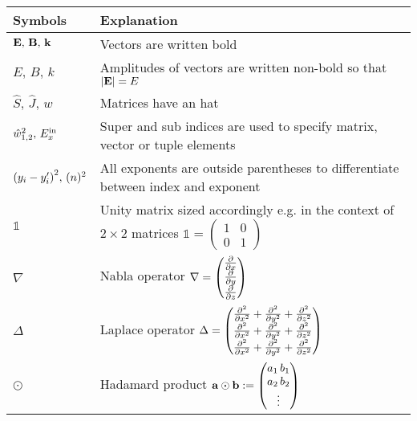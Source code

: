 \begingroup
\renewcommand{\arraystretch}{1.5}
\begin{tabular}{m{4cm} l}
Symbols & Explanation \\
\midrule
$\vb E, \, \vb B, \, \vb k$ & Vectors are written bold \\
$E, \, B, \, k $ &
Amplitudes of vectors are written non-bold so that $\qty|\vb E| = E$ \\
$\hat S, \, \hat J, \, \hat w$ & Matrices have an hat \\
$\hat w^2_{1,2}, \, E^{\mathrm{in}}_x$ & Super and sub indices are used to specify matrix, vector or tuple elements \\
$\qty(y_i - y_i')^2, \, (n)^2$ & All exponents are outside parentheses to differentiate between index and exponent \\
$\mathds 1$ & Unity matrix sized accordingly e.g. in the context of $2 \times 2$ matrices
$\mathds 1 = 
\begin{pmatrix}
    1 & 0\\
    0 & 1
\end{pmatrix}$\\
$\nabla$ & Nabla operator
$\nabla
= \begin{pmatrix}
    \pdv x \\
    \pdv y \\
    \pdv z
\end{pmatrix}$ \\
$\Delta$ & Laplace operator $\Delta =
\begin{pmatrix}
    \pdv[2] x + \pdv[2] y + \pdv[2] z \\
    \pdv[2] x + \pdv[2] y + \pdv[2] z \\
    \pdv[2] x + \pdv[2] y + \pdv[2] z 
\end{pmatrix}$\\
$\odot$ & Hadamard product
    $\vb a \odot \vb b :=
    \begin{pmatrix}
        a_1 \, b_1 \\
        a_2 \, b_2 \\
        \vdots
    \end{pmatrix}$\\
\end{tabular}
\endgroup
